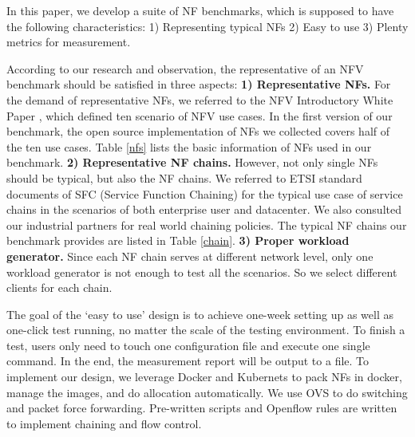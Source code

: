 \documentclass{sig-alternate-10pt}
\begin{document}
In this paper, we develop a suite of NF benchmarks, which is supposed to have the following characteristics: 1) Representing typical NFs 2) Easy to use 3) Plenty metrics for measurement.

According to our research and observation, 
the representative of an NFV benchmark 
should be satisfied in three aspects:
\textbf{1) Representative NFs.}
For the demand of representative NFs, 
we referred to the NFV Introductory White Paper \cite{}, 
which defined ten scenario of NFV use cases. 
In the first version of our benchmark, 
the open source implementation of NFs we collected 
covers half of the ten use cases. 
Table \ref{nfs} lists the basic information of NFs used in our benchmark. 
\textbf{2) Representative NF chains.}
However, not only single NFs should be typical, but also the NF chains. 
We referred to ETSI standard documents of SFC 
(Service Function Chaining) \cite{} 
for the typical use case of service chains 
in the scenarios of both enterprise user and datacenter.
We also consulted our industrial partners for real world chaining policies. 
The typical NF chains our benchmark provides are listed in Table \ref{chain}. 
\textbf{3) Proper workload generator.}
Since each NF chain serves at different network level, 
only one workload generator is not enough to test all the scenarios. 
So we select different clients for each chain.


The goal of the `easy to use' design is to 
achieve one-week setting up as well as one-click test running, 
no matter the scale of the testing environment. 
To finish a test, users only need to touch one configuration file 
and execute one single command. 
In the end, the measurement report will be output to a file.
To implement our design, 
we leverage Docker and Kubernets to pack NFs in docker, 
manage the images, and do allocation automatically. 
We use OVS to do switching and packet force forwarding.
Pre-written scripts and Openflow rules are written 
to implement chaining and flow control. 
\end{document}
